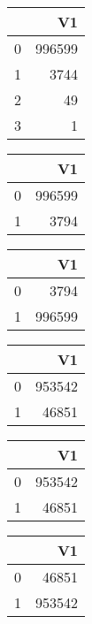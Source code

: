 \bigskip\bigskip
\centering
\begin{tabular}{rr}
  \hline
 & V1 \\ 
  \hline
0 & 996599 \\ 
  1 & 3744 \\ 
  2 &  49 \\ 
  3 &   1 \\ 
   \hline
\end{tabular}

\bigskip\bigskip
\centering
\begin{tabular}{rr}
  \hline
 & V1 \\ 
  \hline
0 & 996599 \\ 
  1 & 3794 \\ 
   \hline
\end{tabular}

\bigskip\bigskip
\centering
\begin{tabular}{rr}
  \hline
 & V1 \\ 
  \hline
0 & 3794 \\ 
  1 & 996599 \\ 
   \hline
\end{tabular}

\bigskip\bigskip
\centering
\begin{tabular}{rr}
  \hline
 & V1 \\ 
  \hline
0 & 953542 \\ 
  1 & 46851 \\ 
   \hline
\end{tabular}

\bigskip\bigskip
\centering
\begin{tabular}{rr}
  \hline
 & V1 \\ 
  \hline
0 & 953542 \\ 
  1 & 46851 \\ 
   \hline
\end{tabular}

\bigskip\bigskip
\centering
\begin{tabular}{rr}
  \hline
 & V1 \\ 
  \hline
0 & 46851 \\ 
  1 & 953542 \\ 
   \hline
\end{tabular}

